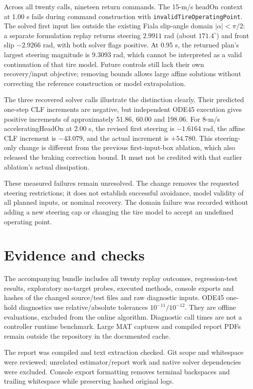 \documentclass[11pt]{article}
\begin{document}
Across all twenty calls, nineteen return commands. The 15-m/s headOn context
at 1.00 s fails during command construction with
\texttt{invalidTireOperatingPoint}. The solved first input lies outside the
existing Fiala slip-angle domain $|\alpha|<\pi/2$: a separate formulation
replay returns steering $2.9911$ rad (about $171.4^\circ$) and front slip
$-2.9266$ rad, with both solver flags positive. At 0.95 s, the returned
plan's largest steering magnitude is 9.3093 rad, which cannot be interpreted
as a valid continuation of that tire model. Future controls still lack their
own recovery/input objective; removing bounds allows large affine solutions
without correcting the reference construction or model extrapolation.

The three recovered solver calls illustrate the distinction clearly. Their
predicted one-step CLF increments are negative, but independent ODE45
execution gives positive increments of approximately 51.86, 60.00 and 198.06.
For 8-m/s acceleratingHeadOn at 2.00 s, the revised first steering is
$-1.6164$ rad, the affine CLF increment is $-43.079$, and the actual increment
is $+54.780$. This steering-only change is different from the previous
first-input-box ablation, which also released the braking correction bound.
It must not be credited with that earlier ablation's actual dissipation.

These measured failures remain unresolved. The change removes the requested
steering restrictions; it does not establish successful avoidance, model
validity of all planned inputs, or nominal recovery. The domain failure was
recorded without adding a new steering cap or changing the tire model to
accept an undefined operating point.

\section{Evidence and checks}
The accompanying bundle includes all twenty replay outcomes, regression-test
results, exploratory no-target probes, executed methods, console exports and
hashes of the changed source/test files and raw diagnostic inputs. ODE45
one-hold diagnostics use relative/absolute tolerances $10^{-11}/10^{-12}$.
They are offline evaluations, excluded from the online algorithm. Diagnostic
call times are not a controller runtime benchmark. Large MAT captures and
compiled report PDFs remain outside the repository in the documented cache.

The report was compiled and text extraction checked. Git scope and whitespace
were reviewed; unrelated estimator/report work and native solver dependencies
were excluded. Console export formatting removes terminal backspaces and
trailing whitespace while preserving hashed original logs.
\end{document}
